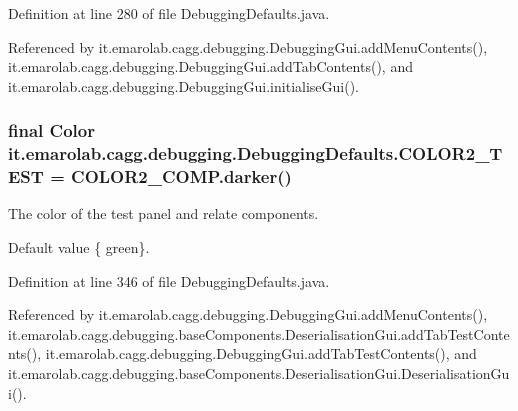 Definition at line 280 of file Debugging\-Defaults.\-java.



Referenced by it.\-emarolab.\-cagg.\-debugging.\-Debugging\-Gui.\-add\-Menu\-Contents(), it.\-emarolab.\-cagg.\-debugging.\-Debugging\-Gui.\-add\-Tab\-Contents(), and it.\-emarolab.\-cagg.\-debugging.\-Debugging\-Gui.\-initialise\-Gui().

\hypertarget{classit_1_1emarolab_1_1cagg_1_1debugging_1_1DebuggingDefaults_a28013e6efe17d286b61999ee35a21933}{
\subsubsection[{C\-O\-L\-O\-R2\-\_\-\-T\-E\-S\-T}]{\setlength{\rightskip}{0pt plus 5cm}final Color it.\-emarolab.\-cagg.\-debugging.\-Debugging\-Defaults.\-C\-O\-L\-O\-R2\-\_\-\-T\-E\-S\-T = C\-O\-L\-O\-R2\-\_\-\-C\-O\-M\-P.\-darker()\hspace{0.3cm}{\ttfamily [static]}}}\label{classit_1_1emarolab_1_1cagg_1_1debugging_1_1DebuggingDefaults_a28013e6efe17d286b61999ee35a21933}
The color of the test panel and relate components. \par
 Default value \{ green\}. 

Definition at line 346 of file Debugging\-Defaults.\-java.



Referenced by it.\-emarolab.\-cagg.\-debugging.\-Debugging\-Gui.\-add\-Menu\-Contents(), it.\-emarolab.\-cagg.\-debugging.\-base\-Components.\-Deserialisation\-Gui.\-add\-Tab\-Test\-Contents(), it.\-emarolab.\-cagg.\-debugging.\-Debugging\-Gui.\-add\-Tab\-Test\-Contents(), and it.\-emarolab.\-cagg.\-debugging.\-base\-Components.\-Deserialisation\-Gui.\-Deserialisation\-Gui().

